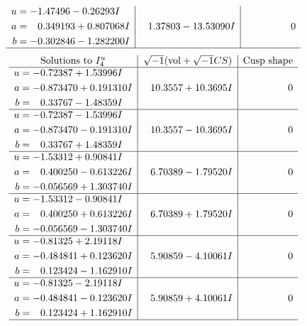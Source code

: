 \documentclass[1p]{elsarticle_modified}
\theoremstyle{definition}
\newcommand{\I}{\sqrt{-1}}
\begin{document}
$$\begin{array}{c|c|c}
\begin{aligned}
u &= -1.47496 - 0.26293 I \\
a &= \phantom{-}0.349193 + 0.807068 I \\
b &= -0.302846 - 1.282200 I\end{aligned}
 & \phantom{-}1.37803 - 13.53090 I & \phantom{-0.000000 } 0\\
 \hline 
 \end{array}$$\newpage$$\begin{array}{c|c|c}  
\text{Solutions to }I^u_{4}& \I (\text{vol} + \sqrt{-1}CS) & \text{Cusp shape}\\
 \hline 
\begin{aligned}
u &= -0.72387 + 1.53996 I \\
a &= -0.873470 + 0.191310 I \\
b &= \phantom{-}0.33767 - 1.48359 I\end{aligned}
 & \phantom{-}10.3557 + 10.3695 I & \phantom{-0.000000 } 0 \\ \hline\begin{aligned}
u &= -0.72387 - 1.53996 I \\
a &= -0.873470 - 0.191310 I \\
b &= \phantom{-}0.33767 + 1.48359 I\end{aligned}
 & \phantom{-}10.3557 - 10.3695 I & \phantom{-0.000000 } 0 \\ \hline\begin{aligned}
u &= -1.53312 + 0.90841 I \\
a &= \phantom{-}0.400250 - 0.613226 I \\
b &= -0.056569 + 1.303740 I\end{aligned}
 & \phantom{-}6.70389 - 1.79520 I & \phantom{-0.000000 } 0 \\ \hline\begin{aligned}
u &= -1.53312 - 0.90841 I \\
a &= \phantom{-}0.400250 + 0.613226 I \\
b &= -0.056569 - 1.303740 I\end{aligned}
 & \phantom{-}6.70389 + 1.79520 I & \phantom{-0.000000 } 0 \\ \hline\begin{aligned}
u &= -0.81325 + 2.19118 I \\
a &= -0.484841 + 0.123620 I \\
b &= \phantom{-}0.123424 - 1.162910 I\end{aligned}
 & \phantom{-}5.90859 - 4.10061 I & \phantom{-0.000000 } 0 \\ \hline\begin{aligned}
u &= -0.81325 - 2.19118 I \\
a &= -0.484841 - 0.123620 I \\
b &= \phantom{-}0.123424 + 1.162910 I\end{aligned}
 & \phantom{-}5.90859 + 4.10061 I & \phantom{-0.000000 } 0\\
 \hline 
 \end{array}$$\newpage\newpage\renewcommand{\arraystretch}{1}
\end{document}
